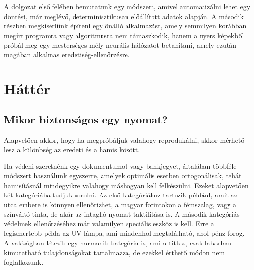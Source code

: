 A dolgozat első felében bemutatunk egy módszert, amivel automatizálni lehet egy döntést, már 
meglévő, determinisztikusan előállított adatok alapján. A második részben megkísérlünk építeni egy 
önálló alkalmazást, amely semmilyen korábban megírt programra vagy algoritmusra 
nem támaszkodik, hanem a nyers képekből próbál meg egy mesterséges mély neurális hálózatot betanítani, 
amely ezután magában alkalmas eredetiség-ellenőrzésre.


%

\newpage
\section{Háttér}

%
%





\subsection{Mikor biztonságos egy nyomat?}
\label{sec:nyomatbiztonsag}

Alapvetően akkor, hogy ha megpróbáljuk valahogy reprodukálni, akkor
mérhető lesz a különbség az eredeti és a hamis között.

Ha védeni szeretnénk egy dokumentumot vagy bankjegyet, általában 
többféle módszert használunk egyszerre, amelyek optimális esetben 
ortogonálisak, tehát hamisításnál mindegyikre valahogy máshogyan kell 
felkészülni. Ezeket alapvetően két kategóriába tudjuk sorolni. 
Az első kategóriához tartozik például, amit az utca embere is könnyen ellenőrizhet, 
a magyar forintokon a fémszalag, vagy a színváltó tinta, de akár az intaglió nyomat taktilitása is.
A második kategóriás védelmek ellenőrzéséhez már valamilyen speciális eszköz is kell. Erre a legismertebb 
példa az UV lámpa, ami mindenhol megtalálható, ahol pénz forog.
A valóságban létezik egy harmadik kategória is, ami a titkos, csak 
laborban kimutatható tulajdonságokat tartalmazza, de ezekkel érthető
módon nem foglalkozunk.


